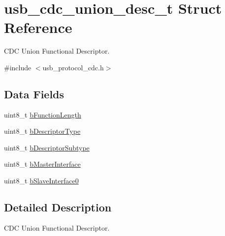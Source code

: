 \hypertarget{structusb__cdc__union__desc__t}{
\section{usb\-\_\-cdc\-\_\-union\-\_\-desc\-\_\-t \-Struct \-Reference}
\label{structusb__cdc__union__desc__t}
}


\-C\-D\-C \-Union \-Functional \-Descriptor.  




{\ttfamily \#include $<$usb\-\_\-protocol\-\_\-cdc.\-h$>$}

\subsection*{\-Data \-Fields}
\begin{DoxyCompactItemize}
\item 
uint8\-\_\-t \hyperlink{structusb__cdc__union__desc__t_a7db931fd74ad9e709cb32ce747c21a86}{b\-Function\-Length}
\item 
uint8\-\_\-t \hyperlink{structusb__cdc__union__desc__t_a44a36f89b22074bdb06b38149ff733ac}{b\-Descriptor\-Type}
\item 
uint8\-\_\-t \hyperlink{structusb__cdc__union__desc__t_a779233efcf69f0bcad014ac3b6c9229c}{b\-Descriptor\-Subtype}
\item 
uint8\-\_\-t \hyperlink{structusb__cdc__union__desc__t_af4e4d675b8761d7add9bf4137b94b111}{b\-Master\-Interface}
\item 
uint8\-\_\-t \hyperlink{structusb__cdc__union__desc__t_af5d1cb7921388e8c381082db723e693d}{b\-Slave\-Interface0}
\end{DoxyCompactItemize}


\subsection{\-Detailed \-Description}
\-C\-D\-C \-Union \-Functional \-Descriptor. 

